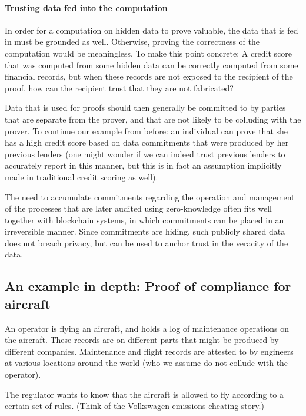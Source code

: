 \paragraph[:]{Trusting data fed into the computation}
In order for a computation on hidden data to prove valuable, the data that is fed in must be grounded as well. 
Otherwise, proving the correctness of the computation would be meaningless. 
To make this point concrete: A credit score that was computed from some hidden data can be correctly computed from some financial records, but when these records are not exposed to the recipient of the proof, how can the recipient trust that they are not fabricated? 
\loosen


Data that is used for proofs should then generally be committed to by parties that are separate from the prover, and that are not likely to be colluding with the prover. 
To continue our example from before: 
an individual can prove that she has a high credit score based on data commitments that were produced by her previous lenders (one might wonder if we can indeed trust previous lenders to accurately report in this manner, but this is in fact an assumption implicitly made in traditional credit scoring as well).   

The need to accumulate commitments regarding the operation and management of the processes that are later audited using zero-knowledge often fits well together with blockchain systems, in which commitments can be placed in an irreversible manner. 
Since commitments are hiding, such publicly shared data does not breach privacy, but can be used to anchor trust in the veracity of the data. 
\loosen


\subsection{An example in depth: Proof of compliance for aircraft}
\label{apps:regulation-compliance:example-compliance-aircraft}

An operator is flying an aircraft, and holds a log of maintenance operations on the aircraft.  
These records are on different parts that might be produced by different companies.
Maintenance and flight records are attested to by engineers at various locations around the world (who we assume do not collude with the operator). 

The regulator wants to know that the aircraft is allowed to fly according to a certain set of rules.
(Think of the Volkswagen emissions cheating story.)

